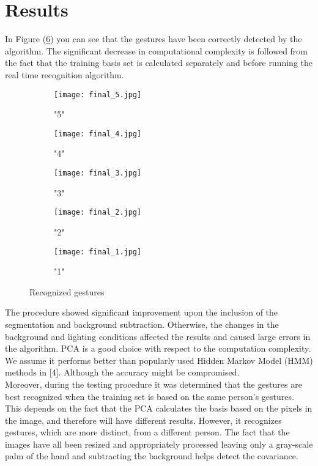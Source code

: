 \documentclass[12pt]{report}
\begin{document}
\section*{Results}
In Figure (\ref{fig:gestures}) you can see that the gestures have been correctly detected by the algorithm. The significant decrease in computational complexity is followed from the fact that the training basis set is calculated separately and before running the real time recognition algorithm.
\begin{figure}
\centering
\begin{subfigure}{.18\textwidth}
  \centering
  \texttt{[image: final\_5.jpg]}
  \caption{"5"}
  \label{fig:sub1}
\end{subfigure}%
\begin{subfigure}{.18\textwidth}
  \centering
  \texttt{[image: final\_4.jpg]}
  \caption{"4"}
  \label{fig:sub2}
\end{subfigure}
\begin{subfigure}{.18\textwidth}
  \centering
  \texttt{[image: final\_3.jpg]}
  \caption{"3"}
  \label{fig:sub3}
\end{subfigure}
\begin{subfigure}{.18\textwidth}
  \centering
  \texttt{[image: final\_2.jpg]}
  \caption{"2"}
  \label{fig:sub4}
\end{subfigure}
\begin{subfigure}{.18\textwidth}
  \centering
  \texttt{[image: final\_1.jpg]}
  \caption{"1"}
  \label{fig:sub5}
\end{subfigure}
\caption{Recognized gestures}
\label{fig:gestures}
\end{figure}
The procedure showed significant improvement upon the inclusion of the segmentation and background subtraction. Otherwise, the changes in the background and lighting conditions affected the results and caused large errors in the algorithm. PCA is a good choice with respect to the computation complexity. We assume it performs better than popularly used Hidden Markov Model (HMM) methods in [4]. Although the accuracy might be compromised.\\
\newline
Moreover, during the testing procedure it was determined that the gestures are best recognized when the training set is based on the same person's gestures. This depends on the fact that the PCA calculates the basis based on the pixels in the image, and therefore will have different results. However, it recognizes gestures, which are more distinct, from a different person. The fact that the images have all been resized and appropriately processed leaving only a gray-scale palm of the hand and subtracting the background helps detect the covariance.\\
\end{document}
